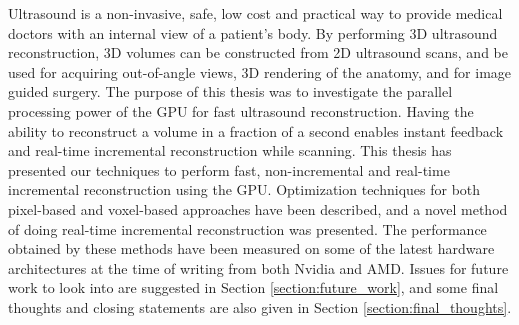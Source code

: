 
Ultrasound is a non-invasive, safe, low cost and practical way to provide medical doctors with an internal view of a patient's body. By performing 3D ultrasound reconstruction, 3D volumes can be constructed from 2D ultrasound scans, and be used for acquiring out-of-angle views, 3D rendering of the anatomy, and for image guided surgery. The purpose of this thesis was to investigate the parallel processing power of the GPU for fast ultrasound reconstruction. Having the ability to reconstruct a volume in a fraction of a second enables instant feedback and real-time incremental reconstruction while scanning. This thesis has presented our techniques to perform fast, non-incremental and real-time incremental reconstruction using the GPU. Optimization techniques for both pixel-based and voxel-based approaches have been described, and a novel method of doing real-time incremental reconstruction was presented. The performance obtained by these methods have been measured on some of the latest hardware architectures at the time of writing from both Nvidia and AMD. Issues for future work to look into are suggested in Section \ref{section:future_work}, and some final thoughts and closing statements are also given in Section \ref{section:final_thoughts}.